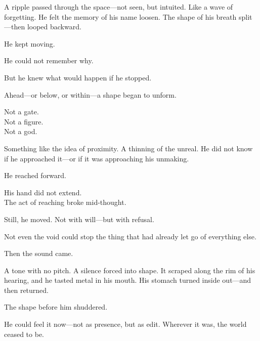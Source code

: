 \documentclass[12pt]{article}
\begin{document}
\vspace{0.5em}
A ripple passed through the space---not seen, but intuited. Like a wave of forgetting. He felt the memory of his name loosen. The shape of his breath split---then looped backward.

\vspace{0.5em}
He kept moving.

\vspace{0.5em}
He could not remember why.

\vspace{0.5em}
But he knew what would happen if he stopped.

\vspace{0.5em}
Ahead---or below, or within---a shape began to unform.

\vspace{0.5em}
Not a gate.\\
Not a figure.\\
Not a god.

\vspace{0.5em}
Something like the idea of proximity. A thinning of the unreal. He did not know if he approached it---or if it was approaching his unmaking.

\vspace{0.5em}
He reached forward.

\vspace{0.5em}
His hand did not extend.\\
The act of reaching broke mid-thought.

\vspace{0.5em}
Still, he moved. Not with will---but with refusal.

\vspace{0.5em}
Not even the void could stop the thing that had already let go of everything else.

\vspace{0.5em}
Then the sound came.

\vspace{0.5em}
A tone with no pitch. A silence forced into shape. It scraped along the rim of his hearing, and he tasted metal in his mouth. His stomach turned inside out---and then returned.

\vspace{0.5em}
The shape before him shuddered.

\vspace{0.5em}
He could feel it now---not as presence, but as edit. Wherever it was, the world ceased to be.
\end{document}
